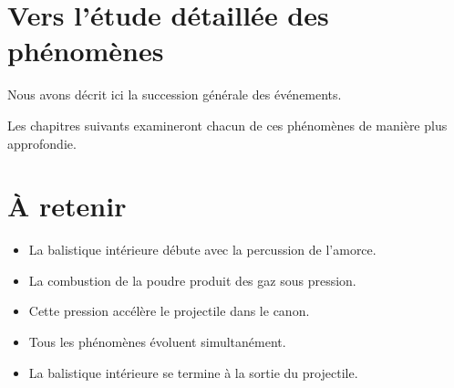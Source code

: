 \section{Vers l'étude détaillée des phénomènes}

Nous avons décrit ici la succession générale des événements.

Les chapitres suivants examineront chacun de ces phénomènes de manière plus
approfondie.

\section{À retenir}

\begin{aretenir}

\begin{itemize}
    \item La balistique intérieure débute avec la percussion de l'amorce.
    \item La combustion de la poudre produit des gaz sous pression.
    \item Cette pression accélère le projectile dans le canon.
    \item Tous les phénomènes évoluent simultanément.
    \item La balistique intérieure se termine à la sortie du projectile.
\end{itemize}

\end{aretenir}

